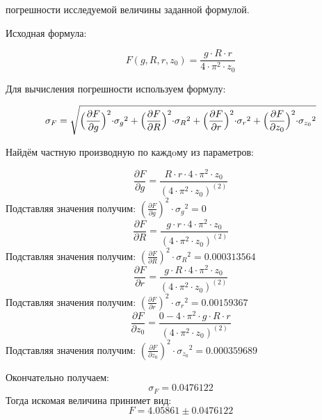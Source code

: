 \documentclass[14pt,a4paper]{scrartcl}
\begin{document}
\begin{center}\begin{large}{ погрешности исследуемой величины заданной формулой.}\end{large}\end{center}

Исходная формула:

 $$F(g,R,r,{z_0}) = \frac {{{g
} \cdot {R
}} \cdot {r
}}{{{4
} \cdot {{{\pi}
} ^ {2
}}} \cdot {{z_0}
}}$$

Для вычисления погрешности используем формулу: 

$$\sigma _{F} = \sqrt{\Bigl(\frac{\partial F}{\partial g}\Bigl)^2\cdot{\sigma _g}^2+\Bigl(\frac{\partial F}{\partial R}\Bigl)^2\cdot{\sigma _R}^2+\Bigl(\frac{\partial F}{\partial r}\Bigl)^2\cdot{\sigma _r}^2+\Bigl(\frac{\partial F}{\partial {z_0}}\Bigl)^2\cdot{\sigma _{z_0}}^2}$$

Найдём частную производную по каждoму из параметров:

$$\frac{\partial F}{\partial g}=\frac {{{R
} \cdot {r
}} \cdot {{{4
} \cdot {{{\pi}
} ^ {2
}}} \cdot {{z_0}
}}}{{({{4
} \cdot {{{\pi}
} ^ {2
}}} \cdot {{z_0}
})} ^ {(2
)}}$$Подставляя значения получим:  
$(\frac{\partial F}{\partial g})^2\cdot{\sigma_g}^2= 0$$$\frac{\partial F}{\partial R}=\frac {{{g
} \cdot {r
}} \cdot {{{4
} \cdot {{{\pi}
} ^ {2
}}} \cdot {{z_0}
}}}{{({{4
} \cdot {{{\pi}
} ^ {2
}}} \cdot {{z_0}
})} ^ {(2
)}}$$Подставляя значения получим:  
$(\frac{\partial F}{\partial R})^2\cdot{\sigma_R}^2= 0.000313564$$$\frac{\partial F}{\partial r}=\frac {{{g
} \cdot {R
}} \cdot {{{4
} \cdot {{{\pi}
} ^ {2
}}} \cdot {{z_0}
}}}{{({{4
} \cdot {{{\pi}
} ^ {2
}}} \cdot {{z_0}
})} ^ {(2
)}}$$Подставляя значения получим:  
$(\frac{\partial F}{\partial r})^2\cdot{\sigma_r}^2= 0.00159367$$$\frac{\partial F}{\partial {z_0}}=\frac {{0
} - {{{4
} \cdot {{{\pi}
} ^ {2
}}} \cdot {{{g
} \cdot {R
}} \cdot {r
}}}}{{({{4
} \cdot {{{\pi}
} ^ {2
}}} \cdot {{z_0}
})} ^ {(2
)}}$$Подставляя значения получим:  
$(\frac{\partial F}{\partial {z_0}})^2\cdot{\sigma_{z_0}}^2= 0.000359689$

Окончательно получаем:$$\sigma _{F} = 0.0476122$$Тогда искомая величина принимет вид:
$$ F = 4.05861 \pm 0.0476122$$
\end{document}
